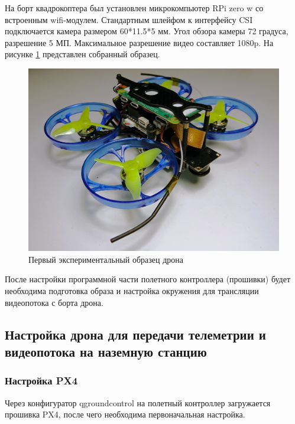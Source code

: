На борт квадрокоптера был установлен микрокомпьютер RPi zero w со встроенным wifi-модулем. Стандартным шлейфом к интерфейсу CSI подключается камера размером 60*11.5*5 мм. Угол обзора камеры 72 градуса, разрешение 5 МП. Максимальное разрешение видео составляет 1080p. На рисунке \ref{fig:drone1} представлен собранный образец.

\begin{figure}[H]
	\centering
	\includegraphics[width=0.5\linewidth]{./pics/drone}
	\caption{Первый экспериментальный образец дрона
	}
	\label{fig:drone1} %
\end{figure}

После настройки программной части полетного контроллера (прошивки) будет необходима подготовка образа и настройка окружения для трансляции видеопотока с борта дрона.


\subsection{Настройка дрона для передачи телеметрии и видеопотока на наземную станцию}


\subsubsection{Настройка PX4}
Через конфигуратор qgroundcontrol на полетный контроллер загружается прошивка PX4, после чего необходима первоначальная настройка.

